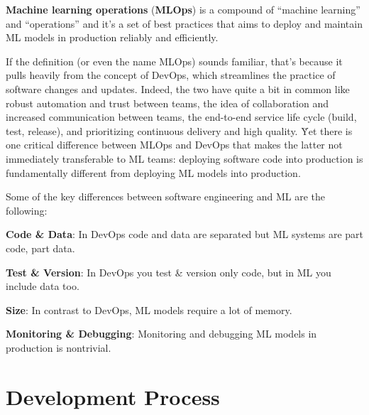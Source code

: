 \textbf{Machine learning operations} (\textbf{MLOps}) is a compound of ``machine learning'' and ``operations'' and
it's a set of best practices that aims to deploy and maintain ML models in production reliably and efficiently.
\ed

If the definition (or even the name MLOps) sounds familiar, that's because it pulls heavily from the concept of
DevOps, which streamlines the practice of software changes and updates. Indeed, the two have quite a bit in common
like robust automation and trust between teams, the idea of collaboration and increased communication between teams,
the end-to-end service life cycle (build, test, release), and prioritizing continuous delivery and high quality. \v

Yet there is one critical difference between MLOps and DevOps that makes the latter not immediately transferable to
ML teams: deploying software code into production is fundamentally different from deploying ML models into
production.


Some of the key differences between software engineering and ML are the following:
\bit
\item \textbf{Code \& Data}: In DevOps code and data are separated but ML systems are part code, part data.
\item \textbf{Test \& Version}: In DevOps you test \& version only code, but in ML you include data too.
\item \textbf{Size}: In contrast to DevOps, ML models require a lot of memory.
\item \textbf{Monitoring \& Debugging}: Monitoring and debugging ML models in production is nontrivial.
\eit

\section{Development Process}\label{sec:development_process}

